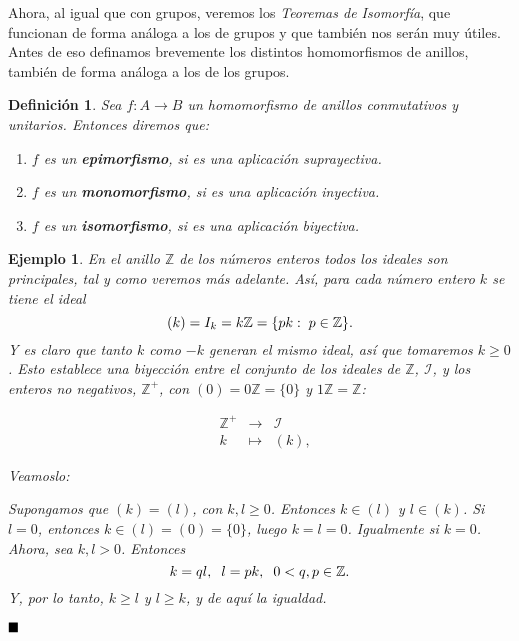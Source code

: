 \documentclass[12pt]{article}
\newtheorem{definition}[theorem]{Definición}
\newtheorem{example}{Ejemplo}[theorem]
\begin{document}
Ahora, al igual que con grupos, veremos los \textit{Teoremas de Isomorfía}, que funcionan de forma análoga a los de grupos y que también nos serán muy útiles. Antes de eso definamos brevemente los distintos homomorfismos de anillos, también de forma análoga a los de los grupos.

\begin{definition} Sea $f \colon A \longrightarrow B$ un homomorfismo de anillos conmutativos y unitarios. Entonces diremos que: \begin{enumerate}
\item $f$ es un \textbf{epimorfismo}, si es una aplicación suprayectiva.
\item $f$ es un \textbf{monomorfismo}, si es una aplicación inyectiva.
\item $f$ es un \textbf{isomorfismo}, si es una aplicación biyectiva.
\end{enumerate}
\end{definition}

\begin{example} En el anillo $\mathbb{Z}$ de los números enteros todos los ideales son principales, tal y como veremos más adelante. Así, para cada número entero $k$ se tiene el ideal $$(k) = I_{k} = k\mathbb{Z} = \lbrace pk : \hspace{0.1cm} p \in \mathbb{Z} \rbrace.$$ Y es claro que tanto $k$ como $-k$ generan el mismo ideal, así que tomaremos $k \geq 0$. Esto establece una biyección entre el conjunto de los ideales de $\mathbb{Z}$, $\mathcal{I}$, y los enteros no negativos, $\mathbb{Z}^+$, con $(0) = 0\mathbb{Z} = \lbrace 0 \rbrace$ y $1\mathbb{Z} = \mathbb{Z}$:

$$\begin{array}{rccl}
&\mathbb{Z}^+&\longrightarrow & \mathcal{I}\\
&k& \longmapsto &(k),
\end{array}
$$ 

Veamoslo:

Supongamos que $(k) = (l)$, con $k, l \geq 0$. Entonces $k \in (l)$ y $l \in (k)$. Si $l=0$, entonces $k \in (l) = (0) = \lbrace 0 \rbrace$, luego $k = l = 0$. Igualmente si $k = 0$. Ahora, sea $k,l > 0$. Entonces $$k = ql, \hspace{0.2cm} l = pk, \hspace{0.2cm} 0 < q, p \in \mathbb{Z}.$$ Y, por lo tanto, $k \geq l$ y $l \geq k$, y de aquí la igualdad.
\end{example}

$\hfill \blacksquare$
\end{document}
